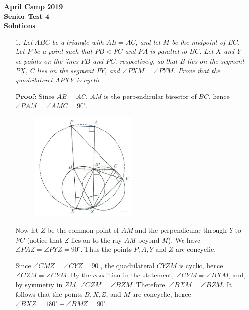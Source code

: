 \documentclass[a4paper, 12pt]{article}
\begin{document}
\begin{center}
\textbf{April Camp 2019 \\ Senior Test 4} \\
\textbf{Solutions}
\end{center}
\vspace{5mm}

\begin{enumerate}

\item[1.]  \textit{Let $ABC$ be a triangle with $AB = AC$, and let $M$ be the midpoint of $BC$. Let $P$ be a point such that $PB < PC$ and $PA$ is parallel to $BC$. Let $X$ and $Y$ be points on the lines $PB$ and $PC$, respectively, so that $B$ lies on the segment $PX$, $C$ lies on the segment $PY$, and $\angle PXM = \angle PYM$. Prove that the quadrilateral $APXY$ is cyclic.
}
\vspace{5mm}

\textbf{Proof: } Since $AB = AC$, $AM$ is the perpendicular bisector of $BC$, hence $\angle PAM = \angle AMC = 90^\circ$.

\begin{figure}[h]
    \centering
    \includegraphics[width = 0.5\textwidth]{2018_G2}
\end{figure}

Now let $Z$ be the common point of $AM$ and the perpendicular through $Y$ to $PC$ (notice that $Z$ lies on to the ray $AM$ beyond $M$). We have $\angle PAZ = \angle PYZ = 90^\circ$. Thus the points $P, A, Y$ and $Z$ are concyclic.

Since $\angle CMZ = \angle CYZ = 90^\circ$, the quadrilateral $CYZM$ is cyclic, hence $\angle CZM = \angle CYM$. By the condition in the statement, $\angle CYM = \angle BXM$, and, by symmetry in $ZM$, $\angle CZM = \angle BZM$. Therefore, $\angle BXM = \angle BZM$. It follows that the points $B, X, Z$, and $M$ are concyclic, hence $\angle BXZ = 180^\circ - \angle BMZ = 90^\circ$.


\end{enumerate}
\end{document}

